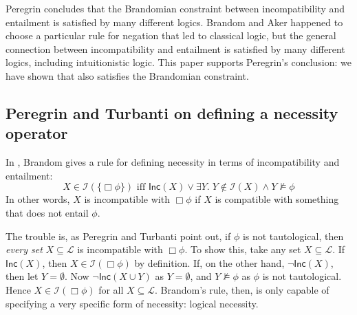 Peregrin concludes that the Brandomian constraint between
incompatibility and entailment is satisfied by many different logics.
Brandom and Aker happened to choose a particular rule for negation
that led to classical logic, but the general connection between
incompatibility and entailment is satisfied by many different logics,
including intuitionistic logic.  This paper supports Peregrin's
conclusion: we have shown that \cathoristic{} also satisfies the
Brandomian constraint.


\subsection{Peregrin and Turbanti on defining a necessity operator}\label{peregrinTurbanti}


In \cite{brandom}, Brandom gives a rule for defining necessity in terms of incompatibility and entailment:
\[
X \in \mathcal{I}(\{\Box \phi\}) \text{ iff } \mathsf{Inc}(X) \lor \exists Y . \; Y \notin \mathcal{I}(X) \land Y \nvDash \phi
\]
In other words, $X$ is incompatible with $\Box \phi$ if $X$ is compatible with something that does not entail $\phi$.

The trouble is, as Peregrin and Turbanti point out, if $\phi$ is not tautological, then \emph{every set} $X \subseteq \mathcal{L}$ is incompatible with $\Box \phi$.
To show this, take any set $X \subseteq \mathcal{L}$. 
If $\mathsf{Inc}(X)$, then $X \in \mathcal{I}(\Box \phi)$ by definition.
If, on the other hand, $\neg \mathsf{Inc}(X)$, then let $Y = \emptyset$.
Now $\neg \mathsf{Inc}(X \cup Y)$ as $Y = \emptyset$, and $Y \nvDash \phi$ as $\phi$ is not tautological.
Hence $X \in \mathcal{I}(\Box \phi)$ for all $X \subseteq \mathcal{L}$. 
Brandom's rule, then, is only capable of specifying a very specific form of necessity: logical necessity.

